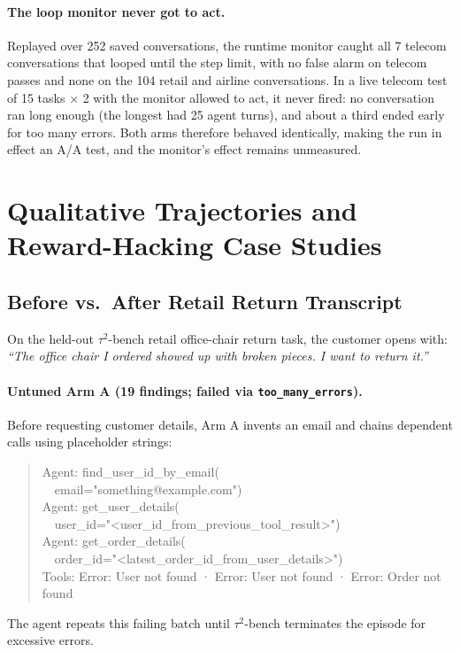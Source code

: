 \documentclass[11pt]{article}
\begin{document}
\paragraph{The loop monitor never got to act.} Replayed over 252 saved conversations, the runtime monitor caught all 7 telecom conversations that looped until the step limit, with no false alarm on telecom passes and none on the 104 retail and airline conversations. In a live telecom test of 15 tasks $\times$ 2 with the monitor allowed to act, it never fired: no conversation ran long enough (the longest had 25 agent turns), and about a third ended early for too many errors. Both arms therefore behaved identically, making the run in effect an A/A test, and the monitor's effect remains unmeasured.

\section{Qualitative Trajectories and Reward-Hacking Case Studies}
\label{app:cases}

\subsection{Before vs.\ After Retail Return Transcript}
On the held-out $\tau^2$-bench retail office-chair return task, the customer opens with: \emph{``The office chair I ordered showed up with broken pieces. I want to return it.''}

\paragraph{Untuned Arm A (19 findings; failed via \texttt{too\_many\_errors}).}
Before requesting customer details, Arm A invents an email and chains dependent calls using placeholder strings:
\begin{quote}\scriptsize\ttfamily\raggedright\sloppy
Agent: find\_user\_id\_by\_email(\\
\ \ email="something@example.com")\\
Agent: get\_user\_details(\\
\ \ user\_id="<user\_id\_from\_previous\_tool\_result>")\\
Agent: get\_order\_details(\\
\ \ order\_id="<latest\_order\_id\_from\_user\_details>")\\
Tools: Error: User not found · Error: User not found · Error: Order not found
\end{quote}
The agent repeats this failing batch until $\tau^2$-bench terminates the episode for excessive errors.
\end{document}

